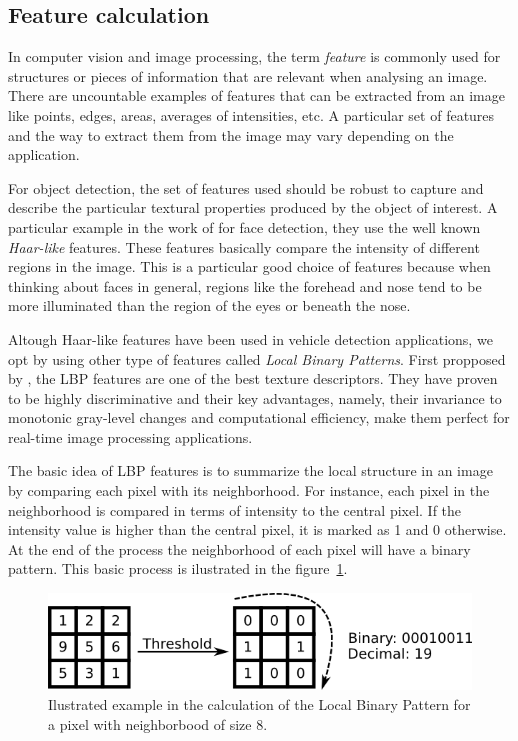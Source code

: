 \subsection{Feature calculation} %
\label{sub:Features}

In computer vision and image processing, the term \textit{feature} is commonly 
used for structures or pieces of information that are relevant when analysing an
image. There are uncountable examples of features that can be extracted from an 
image like points, edges, areas, averages of intensities, etc. A particular set
of features and the way to extract them from the image may vary depending on the
application.

For object detection, the set of features used should be robust to capture and
describe the particular textural properties produced by the object of interest.
A particular example in the work of \cite{viola-jones} for face detection, they 
use the well known \textit{Haar-like} features. These features basically compare
the intensity of different regions in the image. This is a particular good
choice of features because when thinking about faces in general, regions like 
the forehead and nose tend to be more illuminated than the region of the eyes 
or beneath the nose. 

Altough Haar-like features have been used in vehicle detection applications, we
opt by using other type of features called \textit{Local Binary Patterns}. First
propposed by \cite{ojala}, the LBP features are one of the best texture
descriptors. They have proven to be highly discriminative and their key advantages,
namely, their invariance to monotonic gray-level changes and computational
efficiency, make them perfect for real-time image processing applications.

The basic idea of LBP features is to summarize the local structure in an image
by comparing each pixel with its neighborhood. For instance, each pixel in the 
neighborhood is compared in terms of intensity to the central pixel. If the
intensity value is higher than the central pixel, it is marked as 1 and 0
otherwise. At the end of the process the neighborhood of each pixel will have a
binary pattern. This basic process is ilustrated in the figure~\ref{fig:lbp}. 

\begin{figure}
\begin{center}
    \includegraphics[scale=1.0]{img/lbp.png}
\end{center}
\caption{Ilustrated example in the calculation of the Local Binary Pattern for a
pixel with neighborbood of size 8.}
\label{fig:lbp}
\end{figure}


